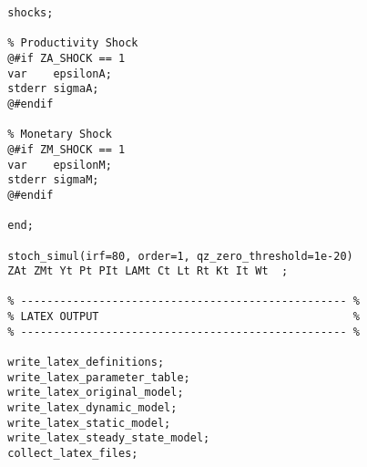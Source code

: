\documentclass[../thesis.tex]{subfiles}
\begin{document}
{\begin{verbatim}
		shocks; 
		
		% Productivity Shock
		@#if ZA_SHOCK == 1
		var    epsilonA;
		stderr sigmaA;
		@#endif
		
		% Monetary Shock
		@#if ZM_SHOCK == 1
		var    epsilonM;
		stderr sigmaM;
		@#endif
		
		end;
		
		stoch_simul(irf=80, order=1, qz_zero_threshold=1e-20) 
		ZAt ZMt Yt Pt PIt LAMt Ct Lt Rt Kt It Wt  ;
		
		% -------------------------------------------------- % 
		% LATEX OUTPUT                                       %
		% -------------------------------------------------- % 
		
		write_latex_definitions;
		write_latex_parameter_table;
		write_latex_original_model;
		write_latex_dynamic_model;
		write_latex_static_model;
		write_latex_steady_state_model;
		collect_latex_files;
		
	\end{verbatim}
	
} %
\end{document}
